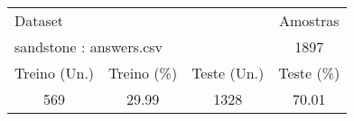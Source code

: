\begin{flushleft}
\begin{tabular}{|c c c c|} \hline
\multicolumn{3}{|l}{Dataset} & Amostras\\ 

\multicolumn{3}{|l}{sandstone : answers.csv} & 1897\\ \hline 

 Treino (Un.) & Treino (\%)  & Teste (Un.) & Teste (\%) \\ \hline 

569 & 29.99 & 1328 & 70.01 \\ 

\hline \hline
\end{tabular}
\end{flushleft}